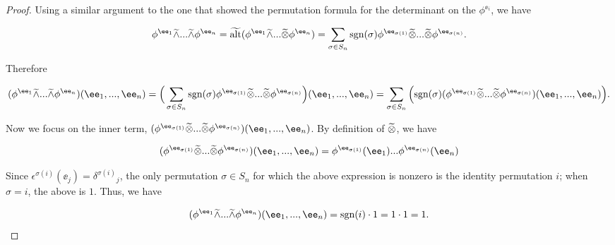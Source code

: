 \begin{proof}
    Using a similar argument to the one that showed the permutation formula for the determinant on the $\phi^{\ee_i}$, we have
    
    \begin{align*}
        \phi^{\ee_1} \twedge ... \twedge \phi^{\ee_n} = \talt(\phi^{\ee_1} \twedge ... \totimes \phi^{\ee_n}) 
        = \sum_{\sigma \in S_n} \sgn(\sigma) \phi^{\ee_{\sigma(1)}} \totimes ... \totimes \phi^{\ee_{\sigma(n)}}.
    \end{align*}
            
    Therefore 
    
    \begin{align*}
         (\phi^{\ee_1} \twedge ... \twedge \phi^{\ee_n})(\ee_1, ..., \ee_n) 
         = \Big( \sum_{\sigma \in S_n} \sgn(\sigma) \phi^{\ee_{\sigma(1)}} \totimes ... \totimes \phi^{\ee_{\sigma(n)}} \Big) (\ee_1, ..., \ee_n) 
         = \sum_{\sigma \in S_n} \Big( \sgn(\sigma) ( \phi^{\ee_{\sigma(1)}} \totimes ... \totimes \phi^{\ee_{\sigma(n)}})(\ee_1, ..., \ee_n) \Big). 
    \end{align*}
    
    Now we focus on the inner term, $(\phi^{\ee_{\sigma(1)}} \totimes ... \totimes \phi^{\ee_{\sigma(n)}})(\ee_1, ..., \ee_n)$. By definition of $\widetilde{\otimes}$, we have
            
    \begin{align*}
        (\phi^{\ee_{\sigma(1)}} \totimes ... \totimes \phi^{\ee_{\sigma(n)}})(\ee_1, ..., \ee_n) 
        =
        \phi^{\ee_{\sigma(1)}}(\ee_1) ... \phi^{\ee_{\sigma(n)}}(\ee_n) 
    \end{align*}
            
    Since $\epsilon^{\sigma(i)}(\ee_j) = \delta^{\sigma(i)}{}_j$, the only permutation $\sigma \in S_n$ for which the above expression is nonzero is the identity permutation $i$; when $\sigma = i$, the above is $1$. Thus, we have
    
    \begin{align*}
        (\phi^{\ee_1} \twedge ... \twedge \phi^{\ee_n})(\ee_1, ..., \ee_n) = \sgn(i) \cdot 1 = 1 \cdot 1 = 1. 
    \end{align*}
\end{proof}

